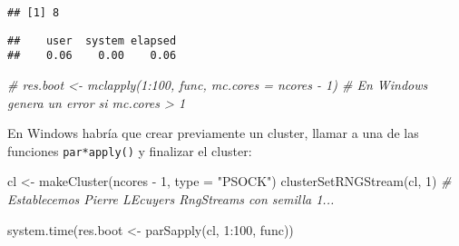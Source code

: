 \documentclass[
]{book}
\newenvironment{Shaded}{\begin{snugshade}}{\end{snugshade}}
\newcommand{\AttributeTok}[1]{\textcolor[rgb]{0.77,0.63,0.00}{#1}}
\newcommand{\CommentTok}[1]{\textcolor[rgb]{0.56,0.35,0.01}{\textit{#1}}}
\newcommand{\ConstantTok}[1]{\textcolor[rgb]{0.00,0.00,0.00}{#1}}
\newcommand{\ControlFlowTok}[1]{\textcolor[rgb]{0.13,0.29,0.53}{\textbf{#1}}}
\newcommand{\DecValTok}[1]{\textcolor[rgb]{0.00,0.00,0.81}{#1}}
\newcommand{\FunctionTok}[1]{\textcolor[rgb]{0.00,0.00,0.00}{#1}}
\newcommand{\NormalTok}[1]{#1}
\newcommand{\OtherTok}[1]{\textcolor[rgb]{0.56,0.35,0.01}{#1}}
\newcommand{\SpecialCharTok}[1]{\textcolor[rgb]{0.00,0.00,0.00}{#1}}
\newcommand{\StringTok}[1]{\textcolor[rgb]{0.31,0.60,0.02}{#1}}
\theoremstyle{break}
\theoremstyle{definition}
\theoremstyle{definition}
\theoremstyle{definition}
\theoremstyle{definition}
\theoremstyle{remark}
\begin{document}
\begin{verbatim}
## [1] 8
\end{verbatim}

\begin{Shaded}
\end{Shaded}

\begin{verbatim}
##    user  system elapsed 
##    0.06    0.00    0.06
\end{verbatim}

\begin{Shaded}
\begin{Highlighting}[]
\CommentTok{\# res.boot \textless{}{-} mclapply(1:100, func, mc.cores = ncores {-} 1) \# En Windows genera un error si mc.cores \textgreater{} 1}
\end{Highlighting}
\end{Shaded}

En Windows habría que crear previamente un cluster, llamar a una de las funciones
\texttt{par*apply()} y finalizar el cluster:

\begin{Shaded}
\begin{Highlighting}[]
\NormalTok{cl }\OtherTok{\textless{}{-}} \FunctionTok{makeCluster}\NormalTok{(ncores }\SpecialCharTok{{-}} \DecValTok{1}\NormalTok{, }\AttributeTok{type =} \StringTok{"PSOCK"}\NormalTok{)}
\FunctionTok{clusterSetRNGStream}\NormalTok{(cl, }\DecValTok{1}\NormalTok{) }\CommentTok{\# Establecemos Pierre L\textquotesingle{}Ecuyer\textquotesingle{}s RngStreams con semilla 1...}

\FunctionTok{system.time}\NormalTok{(res.boot }\OtherTok{\textless{}{-}} \FunctionTok{parSapply}\NormalTok{(cl, }\DecValTok{1}\SpecialCharTok{:}\DecValTok{100}\NormalTok{, func))}
\end{Highlighting}
\end{Shaded}
\end{document}
